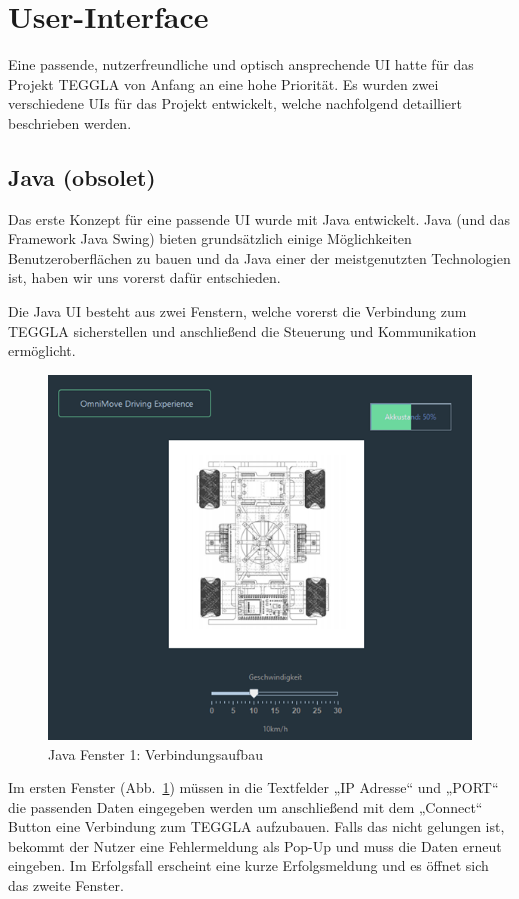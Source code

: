 \section{User-Interface}
Eine passende, nutzerfreundliche und optisch ansprechende UI hatte für das Projekt TEGGLA von Anfang an eine hohe Priorität. Es wurden zwei verschiedene UIs für das Projekt entwickelt, welche nachfolgend detailliert beschrieben werden. 

\subsection{Java (obsolet)}
Das erste Konzept für eine passende UI wurde mit Java entwickelt. 
Java (und das Framework Java Swing) bieten grundsätzlich einige Möglichkeiten Benutzeroberflächen zu bauen und da Java einer der meistgenutzten Technologien ist, haben wir uns vorerst dafür entschieden.

Die Java UI besteht aus zwei Fenstern, welche vorerst die Verbindung zum TEGGLA sicherstellen und anschließend die Steuerung und Kommunikation ermöglicht. 

\begin{figure}[!ht]
	\centering
	\includegraphics[width=\textwidth]{bilder/java1.png}
	\caption{Java Fenster 1: Verbindungsaufbau}
	\label{bild:java1}
\end{figure}


Im ersten Fenster (Abb.~\ref{bild:java1}) müssen in die Textfelder „IP Adresse“ und „PORT“ die passenden Daten eingegeben werden um anschließend mit dem „Connect“ Button eine Verbindung zum TEGGLA aufzubauen. 
Falls das nicht gelungen ist, bekommt der Nutzer eine Fehlermeldung als Pop-Up und muss die Daten erneut eingeben. 
Im Erfolgsfall erscheint eine kurze Erfolgsmeldung und es öffnet sich das zweite Fenster.

